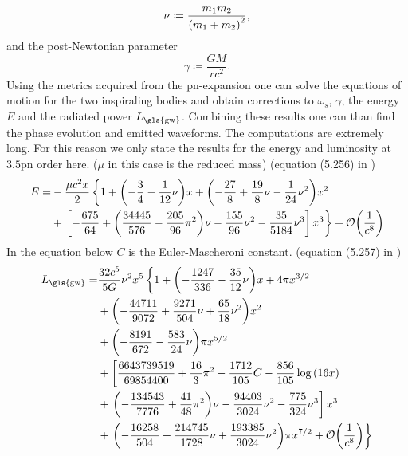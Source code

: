 \begin{equation}
\nu\coloneqq \frac{m_1 m_2}{{\left( m_1 + m_2 \right)}^2},
\end{equation}
and the post-Newtonian parameter
\begin{equation}
\gamma\coloneqq \frac{G M}{r c^2}.
\end{equation}
Using the metrics acquired from the \gls{pn}-expansion one can solve the equations of motion for the two inspiraling bodies and obtain corrections to $\omega_s$, $\gamma$, the energy $E$ and the radiated power $L_\text{\gls{gw}}$. Combining these results one can than find the phase evolution and emitted waveforms. The computations are extremely long. For this reason we only state the results for the energy and luminosity at $3.5$\gls{pn} order here. ($\mu$ in this case is the reduced mass) (equation (5.256) in \cite{gwv1})
\begin{align}
E= & -\frac{\mu c^2 x}{2}\left\{ 1+{\left( -\frac{3}{4}-\frac{1}{12}\nu \right)}x+{\left( -\frac{27}{8}+\frac{19}{8}\nu-\frac{1}{24}\nu^2 \right)}x^2\right.\nonumber\\
& +\left. \left[ -\frac{675}{64}+{\left( \frac{34445}{576}-\frac{205}{96}\pi^2 \right)}\nu -\frac{155}{96}\nu^2 - \frac{35}{5184}\nu^3\right] x^3\right\}+\mathcal{O}{\left( \frac{1}{c^8} \right)}
\end{align}
In the equation below $C$ is the Euler-Mascheroni constant. (equation (5.257) in \cite{gwv1})
\begin{align}
L_\text{\gls{gw}} = & \frac{32 c^5}{5 G}\nu^2 x^5 \left\{ 1 + \lr{-\frac{1247}{336}-\frac{35}{12}\nu}x + 4\pi x^{3/2}\right.\nonumber\\
& + \lr{-\frac{44711}{9072}+\frac{9271}{504}\nu+\frac{65}{18}\nu^2}x^2\nonumber\\
& + \lr{-\frac{8191}{672}-\frac{583}{24}\nu}\pi x^{5/2}\nonumber\\
& + \left[ \frac{6643739519}{69854400}+\frac{16}{3}\pi^2 -\frac{1712}{105}C-\frac{856}{105}\log\lr{16 x}\right.\nonumber\\
& + \left. \lr{-\frac{134543}{7776}+\frac{41}{48}\pi^2}\nu - \frac{94403}{3024}\nu^2 - \frac{775}{324}\nu^3\right] x^3\nonumber\\
& + \left. \lr{-\frac{16258}{504}+\frac{214745}{1728}\nu + \frac{193385}{3024}\nu^2}\pi x^{7/2}+\mathcal{O}\lr{\frac{1}{c^8}}\right\}
\end{align}

